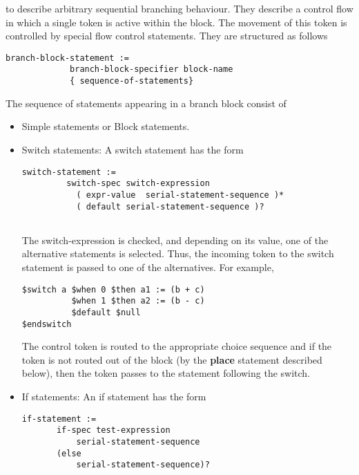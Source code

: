 \documentclass{article}
\begin{document}
\begin{itemize}
to describe arbitrary sequential branching behaviour.  They 
describe a control flow in which a single token 
is active within the block.  The movement of this token is
controlled by special flow control statements.
They are structured 
as follows
\begin{verbatim}
branch-block-statement :=
             branch-block-specifier block-name
             { sequence-of-statements}
\end{verbatim}
The sequence of statements appearing in a branch block
consist of
\begin{itemize}
\item Simple statements or Block statements.
\item Switch statements: A switch statement has
the form
\begin{verbatim}
switch-statement :=
         switch-spec switch-expression
           ( expr-value  serial-statement-sequence )*
           ( default serial-statement-sequence )?
            
\end{verbatim}
The switch-expression is checked, and depending on its
value, one of the alternative statements is selected.
Thus, the incoming token to the switch statement is 
passed to one of the alternatives.  For example,
\begin{verbatim}
$switch a $when 0 $then a1 := (b + c)
          $when 1 $then a2 := (b - c)
          $default $null
$endswitch
\end{verbatim}
The control token is routed to the appropriate
choice sequence and if the token is not routed out 
of the block (by the {\bf place} statement 
described below), then the token passes to the
statement following the switch. 
\item If statements: An if statement has the form
\begin{verbatim}
if-statement :=
       if-spec test-expression 
           serial-statement-sequence
       (else
           serial-statement-sequence)?
       

\end{verbatim}
\end{itemize}
\end{itemize}
\end{document}
